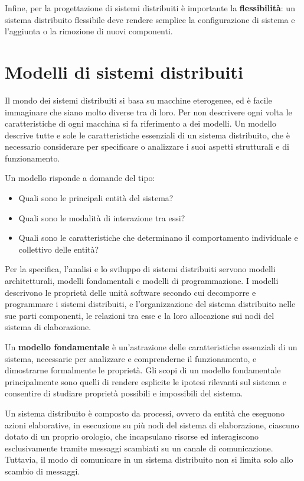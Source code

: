 Infine, per la progettazione di sistemi distribuiti è importante la \textbf{flessibilità}: un sistema distribuito flessibile deve rendere semplice la configurazione di sistema e l'aggiunta o la rimozione di nuovi componenti.
\section{Modelli di sistemi distribuiti}
Il mondo dei sistemi distribuiti si basa su macchine eterogenee, ed è facile immaginare che siano molto diverse tra di loro. Per non descrivere ogni volta le caratteristiche di ogni macchina si fa riferimento a dei modelli. Un modello descrive tutte e sole le caratteristiche essenziali di un sistema distribuito, che è necessario considerare per specificare o analizzare i suoi aspetti strutturali e di funzionamento.

Un modello risponde a domande del tipo:
\begin{itemize}
    \item Quali sono le principali entità del sistema?
    \item Quali sono le modalità di interazione tra essi?
    \item Quali sono le caratteristiche che determinano il comportamento individuale e collettivo delle entità?
\end{itemize}
Per la specifica, l'analisi e lo sviluppo di sistemi distribuiti servono modelli architetturali, modelli fondamentali e modelli di programmazione. I modelli descrivono le proprietà delle unità software secondo cui decomporre e programmare i sistemi distribuiti, e l'organizzazione del sistema distribuito nelle sue parti componenti, le relazioni tra esse e la loro allocazione sui nodi del sistema di elaborazione.

Un \textbf{modello fondamentale} è un'astrazione delle caratteristiche essenziali di un sistema, necessarie per analizzare e comprenderne il funzionamento, e dimostrarne formalmente le proprietà. Gli scopi di un modello fondamentale principalmente sono quelli di rendere esplicite le ipotesi rilevanti sul sistema e consentire di studiare proprietà possibili e impossibili del sistema.

\vspace{5mm}

Un sistema distribuito è composto da processi, ovvero da entità che eseguono azioni elaborative, in esecuzione su più nodi del sistema di elaborazione, ciascuno dotato di un proprio orologio, che incapsulano risorse ed interagiscono esclusivamente tramite messaggi scambiati su un canale di comunicazione. Tuttavia, il modo di comunicare in un sistema distribuito non si limita solo allo scambio di messaggi. 

